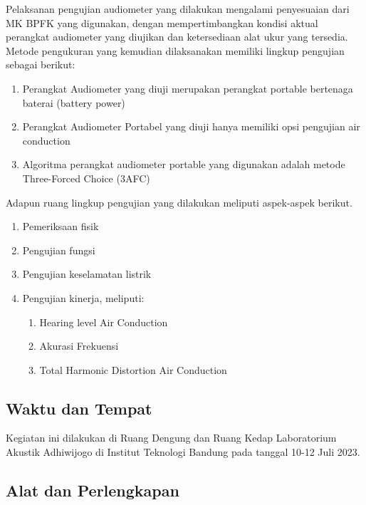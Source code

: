 \documentclass{article}
\begin{document}
	Pelaksanan pengujian audiometer yang dilakukan mengalami penyesuaian dari MK BPFK yang digunakan, dengan mempertimbangkan kondisi aktual perangkat audiometer yang diujikan dan ketersediaan alat ukur yang tersedia. Metode pengukuran yang kemudian dilaksanakan memiliki lingkup pengujian sebagai berikut:
	\begin{enumerate}
		\item Perangkat Audiometer yang diuji merupakan perangkat portable bertenaga baterai (battery power)
		
		\item Perangkat Audiometer Portabel yang diuji hanya memiliki opsi pengujian air conduction
		
		\item  Algoritma perangkat audiometer portable yang digunakan adalah metode Three-Forced Choice (3AFC)
	\end{enumerate}

	\noindent Adapun ruang lingkup pengujian yang dilakukan meliputi aspek-aspek berikut.
	\begin{enumerate}
		\item Pemeriksaan fisik
		
		\item Pengujian fungsi
		
		\item Pengujian keselamatan listrik
		
		\item Pengujian kinerja, meliputi:
		\begin{enumerate}
			\item Hearing level Air Conduction
			
			\item Akurasi Frekuensi
			
			\item Total Harmonic Distortion Air Conduction
		\end{enumerate}
		
	\end{enumerate}

	\subsection{Waktu dan Tempat}

	Kegiatan ini dilakukan di Ruang Dengung dan Ruang Kedap Laboratorium Akustik Adhiwijogo di Institut Teknologi Bandung pada tanggal 10-12 Juli 2023.

	\subsection{Alat dan Perlengkapan}
\end{document}
